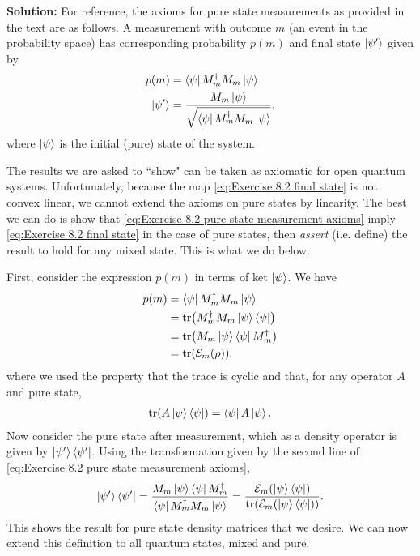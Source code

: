 \documentclass{book}
\newcommand{\mc}[1]{\mathcal{#1}}
\begin{document}
    \textbf{Solution:} For reference, the axioms for pure state measurements as provided in the text are as follows. A measurement with outcome $m$ (an event in the probability space) has corresponding probability $p(m)$ and final state $\ket{\psi'}$ given by
    \begin{align} \label{eq:Exercise 8.2 pure state measurement axioms}
    \begin{aligned} 
        p(m) &= \bra{\psi}M_m^\dagger M_m \ket{\psi} \\
        \ket{\psi'} &= \frac{M_m \ket{\psi}}{\sqrt{\bra{\psi}M_m^\dagger M_m \ket{\psi}}},
    \end{aligned}
    \end{align}
    where $\ket{\psi}$ is the initial (pure) state of the system.
    
    The results we are asked to ``show" can be taken as axiomatic for open quantum systems. Unfortunately, because the map \eqref{eq:Exercise 8.2 final state} is not convex linear, we cannot extend the axioms on pure states by linearity. The best we can do is show that \eqref{eq:Exercise 8.2 pure state measurement axioms} imply \eqref{eq:Exercise 8.2 final state} in the case of pure states, then \emph{assert} (i.e. define) the result to hold for any mixed state. This is what we do below.
    
    First, consider the expression $p(m)$ in terms of ket $\ket{\psi}$. We have
    \begin{align}
    \begin{aligned}
        p(m) &= \bra{\psi}M_m^\dagger M_m \ket{\psi} \\
        &= \tr (M_m^\dagger M_m \ket{\psi}\bra{\psi}) \\
        &= \tr (M_m\ket{\psi}\bra{\psi}M_m^\dagger) \\
        &= \tr(\mc{E}_m(\rho)).
    \end{aligned}
    \end{align}
    where we used the property that the trace is cyclic and that, for any operator $A$ and pure state,
    \begin{align}
        \tr( A \ket{\psi}\bra{\psi}) = \bra{\psi}A\ket{\psi}.
    \end{align}
    Now consider the pure state after measurement, which as a density operator is given by $\ket{\psi'}\bra{\psi'}$. Using the transformation given by the second line of \eqref{eq:Exercise 8.2 pure state measurement axioms},
    \begin{align}
        \ket{\psi'}\bra{\psi'} = \frac{M_m\ket{\psi}\bra{\psi}M_m^\dagger}{\bra{\psi} M_m^\dagger M_m\ket{\psi}} = \frac{\mc{E}_m(\ket{\psi}\bra{\psi})}{\tr(\mc{E}_m(\ket{\psi}\bra{\psi}))}.
    \end{align}
    This shows the result for pure state density matrices that we desire. We can now extend this definition to all quantum states, mixed and pure. 
    
\end{document}
